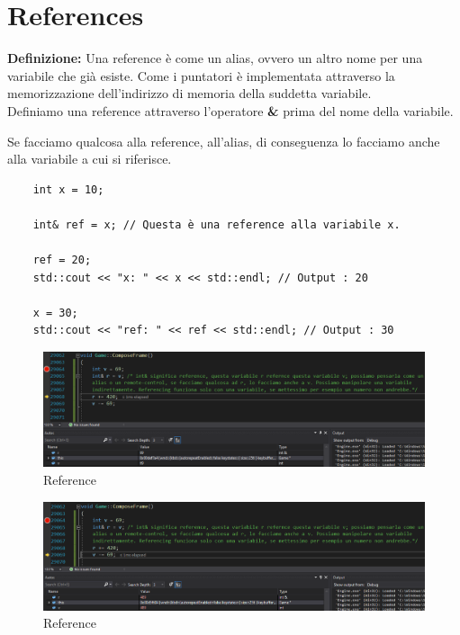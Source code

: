 

\section{References}

\textsf{\small \textbf{Definizione: } Una reference è come un alias, ovvero un altro nome per una variabile che già esiste. Come i puntatori è implementata attraverso la memorizzazione dell'indirizzo di memoria della suddetta variabile.} \\

\textsf{\small Definiamo una reference attraverso l'operatore \textbf{\&} prima del nome della variabile.}

\textsf{\small Se facciamo qualcosa alla reference, all'alias, di conseguenza lo facciamo anche alla variabile a cui si riferisce.} \\

\begin{lstlisting}
	int x = 10;
	
	int& ref = x; // Questa è una reference alla variabile x.
	
	ref = 20;
	std::cout << "x: " << x << std::endl; // Output : 20
	
	x = 30;
	std::cout << "ref: " << ref << std::endl; // Output : 30
\end{lstlisting}

\begin{figure}[ht]
	\centering
	\includegraphics[width=1.2\textwidth, height=1.2\textheight, keepaspectratio]{./imgs/References.png}
	\caption{Reference}
	\label{fig:references1}
\end{figure}

\begin{figure}[ht]
	\centering
	\includegraphics[width=1.2\textwidth, height=1.2\textheight, keepaspectratio]{./imgs/References2.png}
	\caption{Reference}
	\label{fig:references2}
\end{figure}

